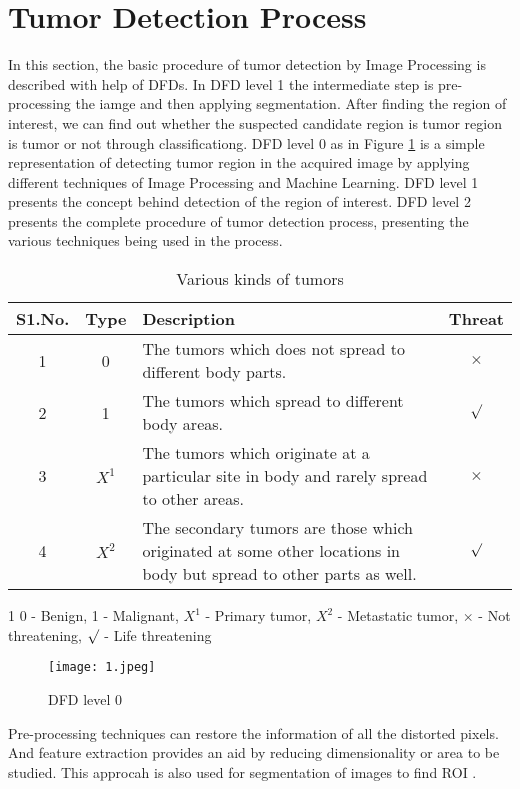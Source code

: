 \documentclass[a4paper,twocolumn]{article}
\begin{document}
\section{Tumor Detection Process}
In this section, the basic procedure of tumor detection by Image Processing is described with help of DFDs. In DFD level 1 the intermediate step is pre-processing the iamge and then applying segmentation. After finding the region of interest, we can find out whether the suspected candidate region is tumor region is tumor or not through classificationg. DFD level 0 as in Figure \ref{fig1} is a simple representation of detecting tumor region in the acquired image by applying different techniques of Image Processing and Machine Learning. DFD level 1 presents the concept behind detection of the region of interest. DFD level 2 presents the complete procedure of tumor detection process, presenting the various techniques being used in the process. \\
\begin{table}[H]
\begin{threeparttable}
\centering
\caption{Various kinds of tumors}
\label{tab1}
\begin{tabular}{|c|c|p{10em}|c|}
  \hline
  S1.No. & Type & Description & Threat \\ \hline
  1 & 0 & The tumors which does not spread to different body parts. & $\times$ \\ \hline
  2 & 1 & The tumors which spread to different body areas. & $\surd$ \\ \hline
  3 & $X^1$ & The tumors which originate at a particular site in body and rarely spread to other areas. & $\times$ \\ \hline
  4 & $X^2$ & The secondary tumors are those which originated at some other locations in body but spread to other parts as well. & $\surd$ \\ \hline
\end{tabular}
\begin{tablenotes}
\item[1] 0 - Benign, 1 - Malignant, $X^1$ - Primary tumor, $X^2$ - Metastatic tumor, $\times$ - Not threatening, $\surd$ - Life threatening
\end{tablenotes}
\end{threeparttable}
\end{table}
\begin{figure}[htbp]
\centering
\texttt{[image: 1.jpeg]}
\caption{DFD level 0}
\label{fig1}
\end{figure}
Pre-processing techniques can restore the information of all the distorted pixels. And feature 
\onecolumn
extraction provides an aid by reducing dimensionality or area to be studied. This approcah is also used for segmentation of images to find ROI \cite{tumor}. \\

\end{document}
